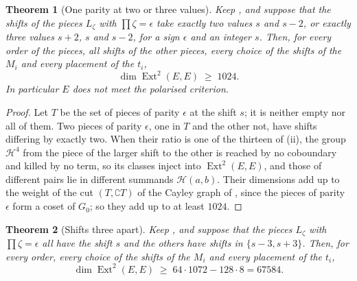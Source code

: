 \documentclass[11pt,reqno]{amsart}
\theoremstyle{plain}
\newtheorem{theorem}{Theorem}[section]
\theoremstyle{definition}
\theoremstyle{remark}
\newcommand{\cH}{\mathcal{H}}
\DeclareMathOperator{\Ext}{Ext}
\begin{document}
\begin{theorem}[One parity at two or three values]\label{thm:efourspreadtwo}
Keep , and suppose that the shifts of the pieces
$L_{\zeta}$ with $\prod\zeta=\epsilon$ take exactly two values $s$ and $s-2$,
or exactly three values $s+2$, $s$ and $s-2$, for a sign $\epsilon$ and an
integer $s$. Then, for every order of the pieces, all shifts of the other
pieces, every choice of the shifts of the $M_{i}$ and every placement of the
$t_{i}$,
\[
  \dim\Ext^{2}(E,E)\;\ge\;1024 .
\]
In particular $E$ does not meet the polarised criterion.
\end{theorem}

\begin{proof}
Let $T$ be the set of pieces of parity $\epsilon$ at the shift $s$; it is
neither empty nor all of them. Two pieces of parity $\epsilon$, one in $T$
and the other not, have shifts differing by exactly two. When their ratio is
one of the thirteen of (ii), the group $\cH^{4}$ from
the piece of the larger shift to the other is reached by no coboundary and
killed by no term, so its classes inject into $\Ext^{2}(E,E)$, and those of
different pairs lie in different summands $\cH(a,b)$. Their dimensions add up
to the weight of the cut $(T,\complement T)$ of the Cayley graph of
, since the pieces of parity $\epsilon$ form a coset of
$G_{0}$; so they add up to at least $1024$.
\end{proof}

\begin{theorem}[Shifts three apart]\label{thm:efourspreadthree}
Keep , and suppose that the pieces $L_{\zeta}$ with
$\prod\zeta=\epsilon$ all have the shift $s$ and the others have shifts in
$\{s-3,s+3\}$. Then, for every order, every choice of the shifts of the
$M_{i}$ and every placement of the $t_{i}$,
\[
  \dim\Ext^{2}(E,E)\;\ge\;64\cdot1072-128\cdot8=67584 .
\]
\end{theorem}
\end{document}
